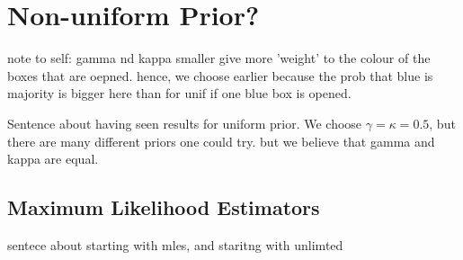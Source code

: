 \section{Non-uniform Prior?}
note to self: gamma nd kappa smaller give more 'weight' to the colour of the boxes that are oepned. hence, we choose earlier because the prob that blue is majority is bigger here than for unif if one blue box is opened. 

Sentence about having seen results for uniform prior. We choose $\gamma=\kappa=0.5$, but there are many different priors one could try. but we believe that gamma and kappa are equal. 

\subsection{Maximum Likelihood Estimators}
sentece about starting with mles, and staritng with unlimted
